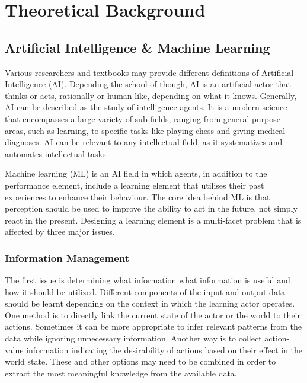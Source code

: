 \chapter{Theoretical Background}
\label{Chapter-Theoretical-Background}

\section{Artificial Intelligence \& Machine Learning}
Various researchers and textbooks may provide different definitions of Artificial Intelligence (AI). Depending the school of though, AI is an artificial actor that thinks or acts, rationally or human-like, depending on what it knows. Generally, AI can be described as the study of intelligence agents. It is a modern science that encompasses a large variety of sub-fields, ranging from general-purpose areas, such as learning, to specific tasks like playing chess and giving medical diagnoses. AI can be relevant to any intellectual field, as it systematizes and automates intellectual tasks. \cite{russell_norvig_2003_1}

Machine learning (ML) is an AI field in which agents, in addition to the performance element, include a learning element that utilises their past experiences to enhance their behaviour. The core idea behind ML is that perception should be used to improve the ability to act in the future, not simply react in the present. Designing a learning element is a multi-facet problem that is affected by three major issues. \cite{russell_norvig_2003_18}

\subsection{Information Management}%
The first issue is determining what information what information is useful and how it should be utilized. Different components of the input and output data should be learnt depending on the context in which the learning actor operates. One method is to directly link the current state of the actor or the world to their actions. Sometimes it can be more appropriate to infer relevant patterns from the data while ignoring unnecessary information. Another way is to collect action-value information indicating the desirability of actions based on their effect in the world state. These and other options may need to be combined in order to extract the most meaningful knowledge from the available data.

